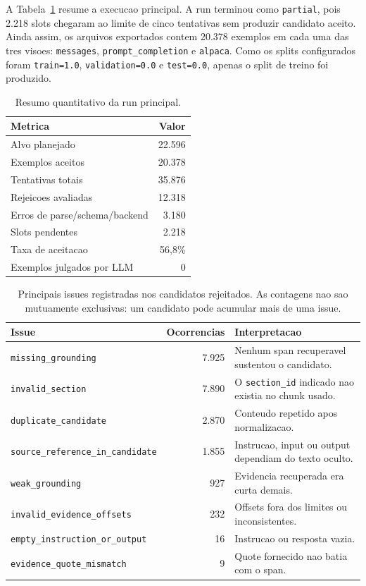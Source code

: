 \documentclass{article}
\begin{document}
A Tabela~\ref{tab:results} resume a execucao principal. A run terminou como
\texttt{partial}, pois 2.218 slots chegaram ao limite de cinco tentativas sem
produzir candidato aceito. Ainda assim, os arquivos exportados contem 20.378
exemplos em cada uma das tres visoes: \texttt{messages},
\texttt{prompt\_completion} e \texttt{alpaca}. Como os splits configurados
foram \texttt{train=1.0}, \texttt{validation=0.0} e \texttt{test=0.0}, apenas
o split de treino foi produzido.

\begin{table}[t]
\centering
\caption{Resumo quantitativo da run principal.}
\label{tab:results}
\small
\begin{tabular}{lr}
\toprule
Metrica & Valor \\
\midrule
Alvo planejado & 22.596 \\
Exemplos aceitos & 20.378 \\
Tentativas totais & 35.876 \\
Rejeicoes avaliadas & 12.318 \\
Erros de parse/schema/backend & 3.180 \\
Slots pendentes & 2.218 \\
Taxa de aceitacao & 56,8\% \\
Exemplos julgados por LLM & 0 \\
\bottomrule
\end{tabular}
\end{table}

\begin{table}[t]
\centering
\caption{Principais issues registradas nos candidatos rejeitados. As contagens
nao sao mutuamente exclusivas: um candidato pode acumular mais de uma issue.}
\label{tab:issues}
\small
\begin{tabular}{lrl}
\toprule
Issue & Ocorrencias & Interpretacao \\
\midrule
\texttt{missing\_grounding} & 7.925 & Nenhum span recuperavel sustentou o candidato. \\
\texttt{invalid\_section} & 7.890 & O \texttt{section\_id} indicado nao existia no chunk usado. \\
\texttt{duplicate\_candidate} & 2.870 & Conteudo repetido apos normalizacao. \\
\texttt{source\_reference\_in\_candidate} & 1.855 & Instrucao, input ou output dependiam do texto oculto. \\
\texttt{weak\_grounding} & 927 & Evidencia recuperada era curta demais. \\
\texttt{invalid\_evidence\_offsets} & 232 & Offsets fora dos limites ou inconsistentes. \\
\texttt{empty\_instruction\_or\_output} & 16 & Instrucao ou resposta vazia. \\
\texttt{evidence\_quote\_mismatch} & 9 & Quote fornecido nao batia com o span. \\
\bottomrule
\end{tabular}
\end{table}
\end{document}

